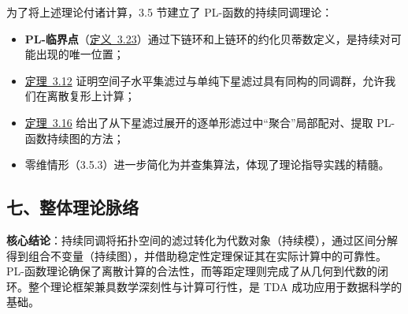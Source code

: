 \documentclass[UTF8]{ctexart}
\begin{document}
为了将上述理论付诸计算，3.5 节建立了 PL-函数的持续同调理论：

\begin{itemize}
    \item \textbf{PL-临界点}（\hyperref[def:pl-critical]{定义~3.23}）通过下链环和上链环的约化贝蒂数定义，是持续对可能出现的唯一位置；
    \item \hyperref[thm:pl-sublevel-isomorphism]{定理~3.12} 证明空间子水平集滤过与单纯下星滤过具有同构的同调群，允许我们在离散复形上计算；
    \item \hyperref[thm:pl-persistence-computation]{定理~3.16} 给出了从下星滤过展开的逐单形滤过中“聚合”局部配对、提取 PL-函数持续图的方法；
    \item 零维情形（3.5.3）进一步简化为并查集算法，体现了理论指导实践的精髓。
\end{itemize}

\subsection*{七、整体理论脉络}

\begin{center}
\end{center}

\noindent \textbf{核心结论}：持续同调将拓扑空间的滤过转化为代数对象（持续模），通过区间分解得到组合不变量（持续图），并借助稳定性定理保证其在实际计算中的可靠性。PL-函数理论确保了离散计算的合法性，而等距定理则完成了从几何到代数的闭环。整个理论框架兼具数学深刻性与计算可行性，是 TDA 成功应用于数据科学的基础。
\end{document}
